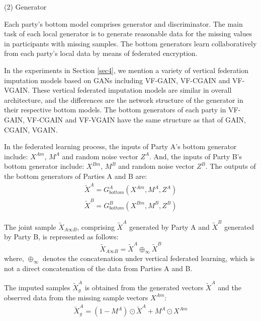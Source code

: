 \documentclass[final,1p,times]{elsarticle}
\begin{document}
(2) Generator 

Each party's bottom model comprises generator and discriminator. The main task of each local generator is to generate reasonable data for the missing values in participants with missing samples. The bottom generators learn collaboratively from each party's local data by means of federated encryption. 

In the experiments in Section \ref{sec4}, we mention a variety of vertical federation imputation models based on GANs including VF-GAIN, VF-CGAIN and VF-VGAIN. These vertical federated imputation models are similar in overall architecture, and the differences are the network structure of the generator in their respective bottom models. The bottom generators of each party in VF-GAIN, VF-CGAIN and VF-VGAIN have the same structure as that of GAIN\cite{24}, CGAIN\cite{25}, VGAIN\cite{27}.

In the federated learning process, the inputs of Party A's bottom generator include:  \( X^{Am} \), $M^A$ and random noise vector $Z^A$. And, the inputs of Party B's bottom generator include: \( X^{Bm} \), $M^B$ and random noise vector $Z^B$. The outputs of the bottom generators of Parties A and B are:
\begin{equation}
	\begin{split}
		\tilde{X}^A=G_{bottom}^A\left(X^{Am},M^A,Z^A\right)\\
		\tilde{X}^B=G_{bottom}^B\left(X^{Bm},M^B,Z^B\right)
	\end{split}
\end{equation}

The joint sample $\tilde{X}_{A\infty B}$, comprising $\tilde{X}^{A}$ generated by Party A and $\tilde{X}^{B}$ generated by Party B, is represented as follows:
\begin{equation}
	\tilde{X}_{A\infty B}=\tilde{X}^A\oplus_\infty\tilde{X}^B
\end{equation}
where, $\oplus_{\infty}$ denotes the concatenation under vertical federated learning, which is not a direct concatenation of the data from Parties A and B.

The imputed samples $\tilde{X}_{g}^{A}$ is obtained from the generated vectors $\tilde{X}^A$ and the observed data from the missing sample vectors $X^{Am}$:
\begin{equation}
	\begin{split}
		\tilde{X}_g^A=(1-M^A)\odot\tilde{X}^A+M^A\odot X^{Am} 
	\end{split}
\end{equation}
\end{document}
